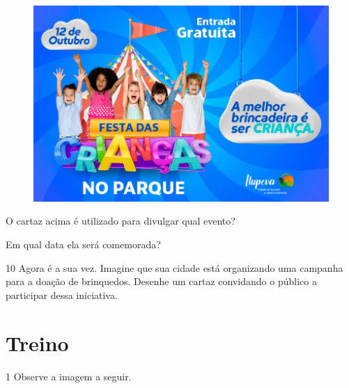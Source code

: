 \begin{figure}[H]
\centering
\includegraphics[width=.8\textwidth]{media/image135.jpeg}
\end{figure}


\begin{escolha}
\item O cartaz acima é utilizado para divulgar qual evento?


\item Em qual data ela será comemorada?

\end{escolha}

\num{10} Agora é a sua vez. Imagine que sua cidade está organizando uma campanha para a doação de brinquedos. Desenhe um cartaz convidando o público a participar dessa iniciativa.

\begin{mdframed}[linewidth=2pt,linecolor=salmao]
\vspace{4cm}
\end{mdframed}

\pagebreak
\section*{Treino}

\num{1} Observe a imagem a seguir.

